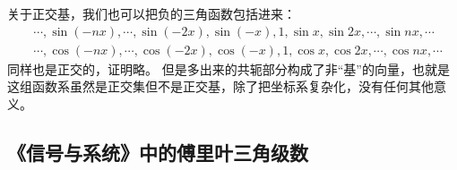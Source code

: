 关于正交基，我们也可以把负的三角函数包括进来：
\begin{align*}
&\cdots ,\sin \left( -nx \right) ,\cdots ,\sin \left( -2x \right) ,\sin \left( -x \right) ,1,\sin x,\sin 2x,\cdots ,\sin nx,\cdots \\
&\cdots ,\cos \left( -nx \right) ,\cdots ,\cos \left( -2x \right) ,\cos \left( -x \right) ,1,\cos x,\cos 2x,\cdots ,\cos nx,\cdots
\end{align*}
同样也是正交的，证明略。
但是多出来的共轭部分构成了非“基”的向量，也就是这组函数系虽然是正交集但不是正交基，除了把坐标系复杂化，没有任何其他意义。

\subsection{《信号与系统》中的傅里叶三角级数}

